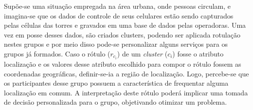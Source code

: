 \begin{exemplo} \label{ex:cel}
Supõe-se uma situação empregada na área urbana, onde pessoas circulam, e imagina-se que os dados de controle de seus celulares estão sendo capturados pelas células das torres e gravados em uma base de dados pelas operadoras. Uma vez em posse desses dados, são criados clusters, podendo ser aplicada rotulação nestes grupos e por meio disso pode-se personalizar alguns serviços para os grupos já formados. Caso o rótulo (${r_{c_i}}$) de um \textit{cluster} (${c_i}$) fosse o atributo localização e os valores desse atributo escolhido para compor o rótulo fossem as coordenadas geográficas, definir-se-ia a região de localização. Logo, percebe-se que os participantes desse grupo possuem a característica de frequentar alguma localização em comum. A interpretação deste rótulo poderá implicar uma tomada de decisão personalizada para o grupo, objetivando otimizar um problema. 
\end{exemplo}
 



